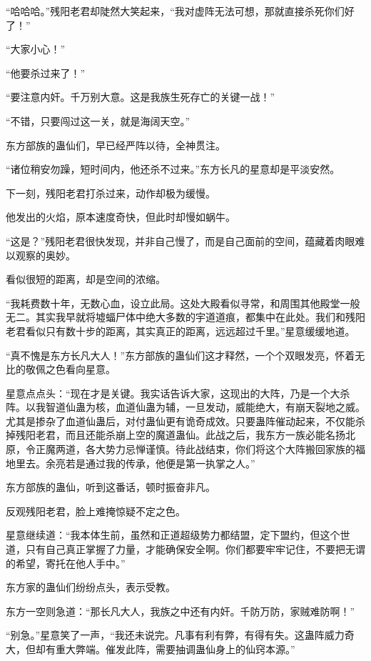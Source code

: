 \begin{this_body}
“哈哈哈。”残阳老君却陡然大笑起来，“我对虚阵无法可想，那就直接杀死你们好了！”

“大家小心！”

“他要杀过来了！”

“要注意内奸。千万别大意。这是我族生死存亡的关键一战！”

“不错，只要闯过这一关，就是海阔天空。”

东方部族的蛊仙们，早已经严阵以待，全神贯注。

“诸位稍安勿躁，短时间内，他还杀不过来。”东方长凡的星意却是平淡安然。

下一刻，残阳老君打杀过来，动作却极为缓慢。

他发出的火焰，原本速度奇快，但此时却慢如蜗牛。

“这是？”残阳老君很快发现，并非自己慢了，而是自己面前的空间，蕴藏着肉眼难以观察的奥妙。

看似很短的距离，却是空间的浓缩。

“我耗费数十年，无数心血，设立此局。这处大殿看似寻常，和周围其他殿堂一般无二。其实我早就将墟蝠尸体中绝大多数的宇道道痕，都集中在此处。我们和残阳老君看似只有数十步的距离，其实真正的距离，远远超过千里。”星意缓缓地道。

“真不愧是东方长凡大人！”东方部族的蛊仙们这才释然，一个个双眼发亮，怀着无比的敬佩之色看向星意。

星意点点头：“现在才是关键。我实话告诉大家，这现出的大阵，乃是一个大杀阵。以我智道仙蛊为核，血道仙蛊为辅，一旦发动，威能绝大，有崩天裂地之威。尤其是掺杂了血道仙蛊后，对付蛊仙更有诡奇成效。只要蛊阵催动起来，不仅能杀掉残阳老君，而且还能杀崩上空的魔道蛊仙。此战之后，我东方一族必能名扬北原，令正魔两道，各大势力忌惮谨慎。待此战结束，你们将这个大阵搬回家族的福地里去。余亮若是通过我的传承，他便是第一执掌之人。”

东方部族的蛊仙，听到这番话，顿时振奋非凡。

反观残阳老君，脸上难掩惊疑不定之色。

星意继续道：“我本体生前，虽然和正道超级势力都结盟，定下盟约，但这个世道，只有自己真正掌握了力量，才能确保安全啊。你们都要牢牢记住，不要把无谓的希望，寄托在他人手中。”

东方家的蛊仙们纷纷点头，表示受教。

东方一空则急道：“那长凡大人，我族之中还有内奸。千防万防，家贼难防啊！”

“别急。”星意笑了一声，“我还未说完。凡事有利有弊，有得有失。这蛊阵威力奇大，但却有重大弊端。催发此阵，需要抽调蛊仙身上的仙窍本源。”


\end{this_body}
